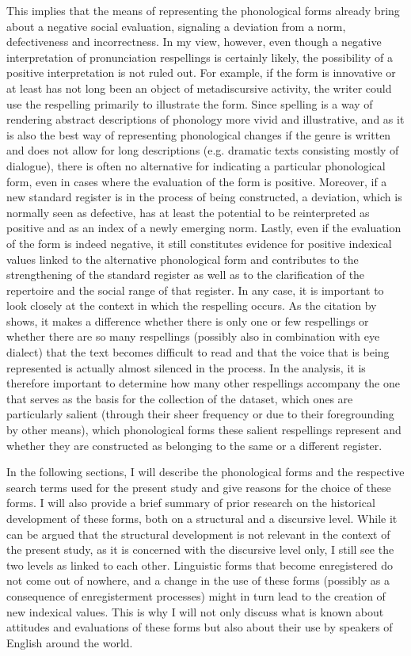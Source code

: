 This implies that the means of representing the phonological forms already bring about a negative social evaluation, signaling a deviation from a norm, defectiveness and incorrectness. In my view, however, even though a negative interpretation of pronunciation respellings is certainly likely, the possibility of a positive interpretation is not ruled out. For example, if the form is innovative or at least has not long been an object of metadiscursive activity, the writer could use the respelling primarily to illustrate the form. Since spelling is a way of rendering abstract descriptions of phonology more vivid and illustrative, and as it is also the best way of representing phonological changes if the genre is written and does not allow for long descriptions (e.g. dramatic texts consisting mostly of dialogue), there is often no alternative for indicating a particular phonological form, even in cases where the evaluation of the form is positive. Moreover, if a new standard register is in the process of being constructed, a deviation, which is normally seen as defective, has at least the potential to be reinterpreted as positive and as an index of a newly emerging norm. Lastly, even if the evaluation of the form is indeed negative, it still constitutes evidence for positive indexical values linked to the alternative phonological form and contributes to the strengthening of the standard register as well as to the clarification of the repertoire and the social range of that register. In any case, it is important to look closely at the context in which the respelling occurs. As the citation by \citet{Jaffe2000} shows, it makes a difference whether there is only one or few respellings or whether there are so many respellings (possibly also in combination with eye dialect) that the text becomes difficult to read and that the voice that is being represented is actually almost silenced in the process. In the analysis, it is therefore important to determine how many other respellings accompany the one that serves as the basis for the collection of the dataset, which ones are particularly salient (through their sheer frequency or due to their foregrounding by other means), which phonological forms these salient respellings represent and whether they are constructed as belonging to the same or a different register.

In the following sections, I will describe the phonological forms and the respective search terms used for the present study and give reasons for the choice of these forms. I will also provide a brief summary of prior research on the historical development of these forms, both on a structural and a discursive level. While it can be argued that the structural development is not relevant in the context of the present study, as it is concerned with the discursive level only, I still see the two levels as linked to each other. Linguistic forms that become enregistered do not come out of nowhere, and a change in the use of these forms (possibly as a consequence of enregisterment processes) might in turn lead to the creation of new indexical values. This is why I will not only discuss what is known about attitudes and evaluations of these forms but also about their use by speakers of English around the world.

